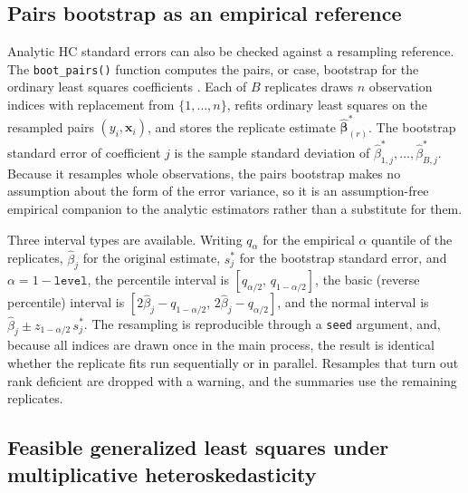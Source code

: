 \subsection{Pairs bootstrap as an empirical reference}\label{pairs-bootstrap-as-an-empirical-reference}

Analytic HC standard errors can also be checked against a resampling reference. The \texttt{boot\_pairs()} function computes the pairs, or case, bootstrap for the ordinary least squares coefficients \citep{DavisonHinkley1997, EfronTibshirani1993}. Each of \(B\) replicates draws \(n\) observation indices with replacement from \(\{1,\ldots,n\}\), refits ordinary least squares on the resampled pairs \((y_i,\mathbf{x}_i)\), and stores the replicate estimate \(\hat{\boldsymbol{\beta}}^{*}_{(r)}\). The bootstrap standard error of coefficient \(j\) is the sample standard deviation of \(\hat\beta^{*}_{1,j},\ldots,\hat\beta^{*}_{B,j}\). Because it resamples whole observations, the pairs bootstrap makes no assumption about the form of the error variance, so it is an assumption-free empirical companion to the analytic estimators rather than a substitute for them.

Three interval types are available. Writing \(q_\alpha\) for the empirical \(\alpha\) quantile of the replicates, \(\hat\beta_j\) for the original estimate, \(s^{*}_j\) for the bootstrap standard error, and \(\alpha=1-\texttt{level}\), the percentile interval is \([q_{\alpha/2},\,q_{1-\alpha/2}]\), the basic (reverse percentile) interval is \([2\hat\beta_j-q_{1-\alpha/2},\,2\hat\beta_j-q_{\alpha/2}]\), and the normal interval is \(\hat\beta_j\pm z_{1-\alpha/2}\,s^{*}_j\). The resampling is reproducible through a \texttt{seed} argument, and, because all indices are drawn once in the main process, the result is identical whether the replicate fits run sequentially or in parallel. Resamples that turn out rank deficient are dropped with a warning, and the summaries use the remaining replicates.

\subsection{Feasible generalized least squares under multiplicative heteroskedasticity}\label{feasible-generalized-least-squares-under-multiplicative-heteroskedasticity}

